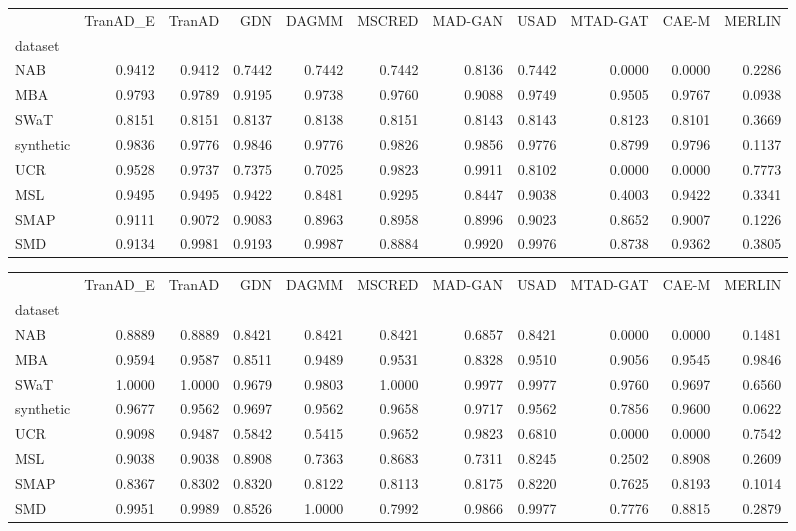 \begin{tabular}{lrrrrrrrrrr}
\toprule
 & TranAD_E & TranAD & GDN & DAGMM & MSCRED & MAD-GAN & USAD & MTAD-GAT & CAE-M & MERLIN \\
dataset &  &  &  &  &  &  &  &  &  &  \\
\midrule
NAB & 0.9412 & 0.9412 & 0.7442 & 0.7442 & 0.7442 & 0.8136 & 0.7442 & 0.0000 & 0.0000 & 0.2286 \\
MBA & 0.9793 & 0.9789 & 0.9195 & 0.9738 & 0.9760 & 0.9088 & 0.9749 & 0.9505 & 0.9767 & 0.0938 \\
SWaT & 0.8151 & 0.8151 & 0.8137 & 0.8138 & 0.8151 & 0.8143 & 0.8143 & 0.8123 & 0.8101 & 0.3669 \\
synthetic & 0.9836 & 0.9776 & 0.9846 & 0.9776 & 0.9826 & 0.9856 & 0.9776 & 0.8799 & 0.9796 & 0.1137 \\
UCR & 0.9528 & 0.9737 & 0.7375 & 0.7025 & 0.9823 & 0.9911 & 0.8102 & 0.0000 & 0.0000 & 0.7773 \\
MSL & 0.9495 & 0.9495 & 0.9422 & 0.8481 & 0.9295 & 0.8447 & 0.9038 & 0.4003 & 0.9422 & 0.3341 \\
SMAP & 0.9111 & 0.9072 & 0.9083 & 0.8963 & 0.8958 & 0.8996 & 0.9023 & 0.8652 & 0.9007 & 0.1226 \\
SMD & 0.9134 & 0.9981 & 0.9193 & 0.9987 & 0.8884 & 0.9920 & 0.9976 & 0.8738 & 0.9362 & 0.3805 \\
\bottomrule
\end{tabular}

\begin{tabular}{lrrrrrrrrrr}
\toprule
 & TranAD_E & TranAD & GDN & DAGMM & MSCRED & MAD-GAN & USAD & MTAD-GAT & CAE-M & MERLIN \\
dataset &  &  &  &  &  &  &  &  &  &  \\
\midrule
NAB & 0.8889 & 0.8889 & 0.8421 & 0.8421 & 0.8421 & 0.6857 & 0.8421 & 0.0000 & 0.0000 & 0.1481 \\
MBA & 0.9594 & 0.9587 & 0.8511 & 0.9489 & 0.9531 & 0.8328 & 0.9510 & 0.9056 & 0.9545 & 0.9846 \\
SWaT & 1.0000 & 1.0000 & 0.9679 & 0.9803 & 1.0000 & 0.9977 & 0.9977 & 0.9760 & 0.9697 & 0.6560 \\
synthetic & 0.9677 & 0.9562 & 0.9697 & 0.9562 & 0.9658 & 0.9717 & 0.9562 & 0.7856 & 0.9600 & 0.0622 \\
UCR & 0.9098 & 0.9487 & 0.5842 & 0.5415 & 0.9652 & 0.9823 & 0.6810 & 0.0000 & 0.0000 & 0.7542 \\
MSL & 0.9038 & 0.9038 & 0.8908 & 0.7363 & 0.8683 & 0.7311 & 0.8245 & 0.2502 & 0.8908 & 0.2609 \\
SMAP & 0.8367 & 0.8302 & 0.8320 & 0.8122 & 0.8113 & 0.8175 & 0.8220 & 0.7625 & 0.8193 & 0.1014 \\
SMD & 0.9951 & 0.9989 & 0.8526 & 1.0000 & 0.7992 & 0.9866 & 0.9977 & 0.7776 & 0.8815 & 0.2879 \\
\bottomrule
\end{tabular}

